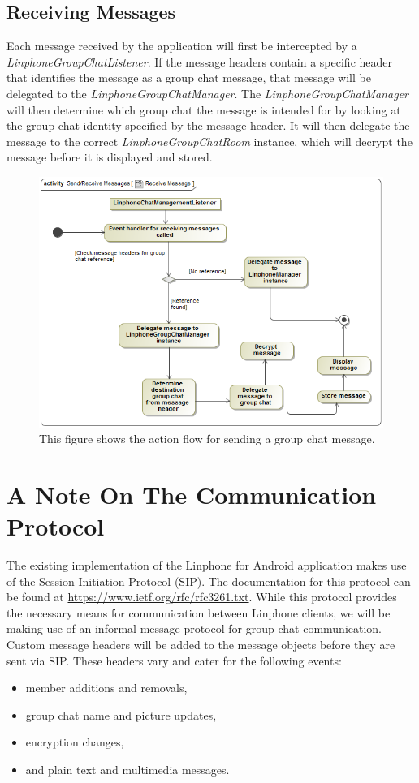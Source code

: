 \documentclass[11pt]{article}
\begin{document}
\subsection{Receiving Messages}
Each message received by the application will first be intercepted by a \textit{LinphoneGroupChatListener}. If the message headers contain a specific header that identifies the message as a group chat message, that message will be delegated to the \textit{LinphoneGroupChatManager}. The \textit{LinphoneGroupChatManager} will then determine which group chat the message is intended for by looking at the group chat identity specified by the message header. It will then delegate the message to the correct \textit{LinphoneGroupChatRoom} instance, which will decrypt the message before it is displayed and stored.
\begin{figure}[H]
\centering
\includegraphics[width=5in]{./images/activity_receive_message.png}
\caption[Receive Message Activity Diagram]{This figure shows the action flow for sending a group chat message.}
\label{ad-receive-message}
\end{figure}

\section{A Note On The Communication Protocol}
The existing implementation of the Linphone for Android application makes use of the Session Initiation Protocol (SIP). The documentation for this protocol can be found at \href{https://www.ietf.org/rfc/rfc3261.txt}{https://www.ietf.org/rfc/rfc3261.txt}. While this protocol provides the necessary means for communication between Linphone clients, we will be making use of an informal message protocol for group chat communication. Custom message headers will be added to the message objects before they are sent via SIP. These headers vary and cater for the following events:
\begin{itemize}
\item member additions and removals,
\item group chat name and picture updates,
\item encryption changes,
\item and plain text and multimedia messages.
\end{itemize}
\end{document}
